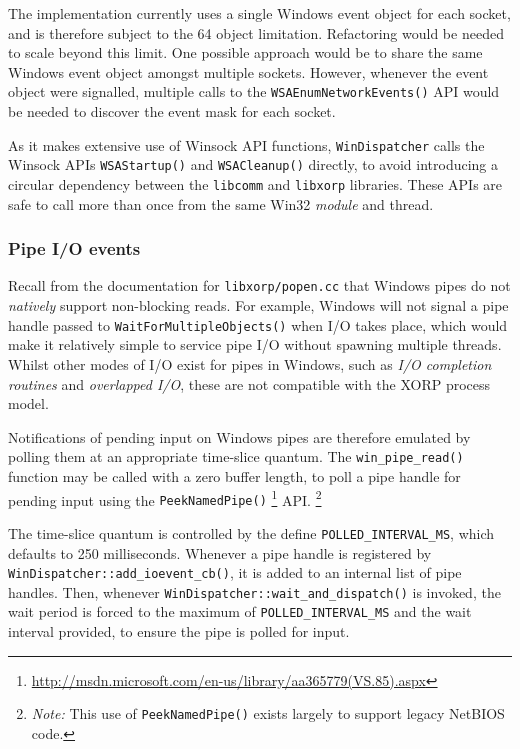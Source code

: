 \documentclass[11pt]{article}
\begin{document}
{The implementation currently uses a single
Windows event object for each socket, and
is therefore subject to the 64 object limitation.
Refactoring would be needed to scale beyond this limit. One possible
approach would be to share the same Windows event object amongst multiple
sockets. However, whenever the event object were signalled,
multiple calls to the
{\tt WSAEnumNetworkEvents()} API would be needed to discover the
event mask for each socket.

As it makes extensive use of Winsock API functions,
{\tt WinDispatcher} calls the Winsock APIs {\tt WSAStartup()} and
{\tt WSACleanup()} directly, to avoid introducing a circular
dependency between the {\tt libcomm} and {\tt libxorp} libraries.
These APIs are safe to call more than once from the same Win32
{\em module} and thread.

\subsubsection{Pipe I/O events}

Recall from the documentation for {\tt libxorp/popen.cc}
that Windows pipes do not {\em natively} support non-blocking reads.
For example, Windows will not signal a pipe handle passed
to {\tt WaitForMultipleObjects()} when
I/O takes place, which would make it relatively simple
to service pipe I/O without spawning multiple threads.
Whilst other modes of I/O exist for pipes in Windows,
such as {\em I/O completion routines}
and {\em overlapped I/O}, these are not compatible with
the XORP process model.

Notifications of pending input on Windows pipes are therefore
emulated by polling them at an appropriate time-slice quantum.
The {\tt win\_pipe\_read()} function
may be called with a zero buffer length,
to poll a pipe handle for pending input using the
{\tt PeekNamedPipe()}
\footnote{\url{http://msdn.microsoft.com/en-us/library/aa365779(VS.85).aspx}}
API.
\footnote{{\em Note:} This use of {\tt PeekNamedPipe()}
exists largely to support legacy NetBIOS code.}

The time-slice quantum is controlled by the define 
{\tt POLLED\_INTERVAL\_MS}, which defaults
to 250 milliseconds.
Whenever a pipe handle is registered by
{\tt WinDispatcher::add\_ioevent\_cb()}, it is added to
an internal list of pipe handles. Then, whenever
{\tt WinDispatcher::wait\_and\_dispatch()} is invoked,
the wait period is forced to the maximum of
{\tt POLLED\_INTERVAL\_MS} and the wait interval
provided,
to ensure the pipe is polled for input.

}
\end{document}
